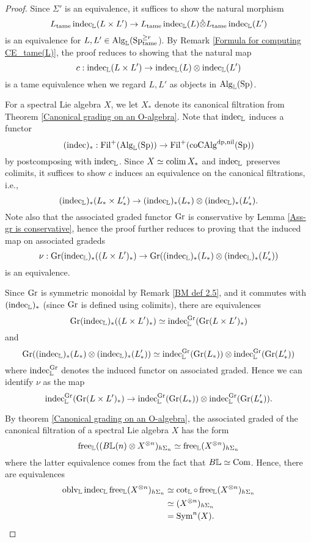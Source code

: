 \begin{proof}
    Since $\Sigma'$ is an equivalence, it suffices to show
	the natural morphism 
	\[
	L_{\tame}\indec_{\BL}(L \times L') 
	\to 
	L_{\tame}\indec_{\BL}(L)\hat{\otimes} 
	L_{\tame}\indec_{\BL}(L') 
	\]
	is an equivalence for $L,L' \in \Alg_{\BL}(\Sp^{\geq r}_{\tame}$). 
	By Remark \ref{Formula for computing CE_tame(L)}, the proof reduces to showing that the natural map 
	\[
    c:	\indec_{\BL}(L \times L') 
	\to 
	\indec_{\BL}(L)\otimes \indec_{\BL}(L') 
	\]
	is a tame equivalence when we regard $L,L'$ as objects in $\Alg_{\BL}(\Sp)$.

	For a spectral Lie algebra $X$, we let $X_*$ denote its canonical filtration from Theorem \ref{Canonical grading on an O-algebra}. 
	Note that $\indec_{\BL}$ induces a functor 
	$$
	(\indec)_*: \Fil^{+}(\Alg_{\BL}(\Sp))
	\to 
	\Fil^{+}(\coCAlg^{\divpow,\nil}(\Sp))
	$$
	by postcomposing with $\indec_{\BL}$.
	Since $X\simeq \colim X_*$ and $\indec_{\BL}$ preserves colimits, it suffices to show $c$ induces an equivalence on the canonical filtrations, i.e.,
	$$
	(\indec_{\BL})_*(L_* \times L'_*)
	\to 
	(\indec_{\BL})_*(L_*) \otimes (\indec_{\BL})_*(L'_*).
	$$
	Note also that the associated graded functor $\Graded$ is conservative by Lemma \ref{Ass-gr is conservative}, hence the proof further reduces to proving that the induced map on associated gradeds
    \[
    \nu:
	\Graded (\indec_{\BL})_*( (L \times L')_{*} )
	\to 
	\Graded ((\indec_{\BL})_*(L_*)\otimes (\indec_{\BL})_*(L'_*))
	\]
	is an equivalence.
	
	Since $\Graded$ is symmetric monoidal by Remark \ref{BM def 2.5}, and it commutes with $(\indec_{\BL})_*$ (since $\Graded$ is defined using colimits), there are equivalences
	$$
	\Graded (\indec_{\BL})_*( (L \times L')_{*} )
	\simeq \indec_{\BL}^{\Graded} (\Graded (L\times L')_{*})
	$$
	and 
	$$
	\Graded ((\indec_{\BL})_*(L_*)\otimes (\indec_{\BL})_*(L'_*)) 
	\simeq 
	\indec^{\Graded}_{\BL}(\Graded(L_*)) \otimes 
	\indec^{\Graded}_{\BL}(\Graded(L'_*))
	$$
	where $\indec^{\Graded}_{\BL}$ denotes the induced functor on associated graded. Hence we can identify $\nu$ as the map
	$$
	\indec_{\BL}^{\Graded} (\Graded (L\times L')_{*}) 
	\to 
	\indec^{\Graded}_{\BL}(\Graded(L_*)) \otimes 
	\indec^{\Graded}_{\BL}(\Graded(L'_*)).
	$$
	
	By theorem \ref{Canonical grading on an O-algebra}, the associated graded of the canonical filtration of a spectral Lie algebra $X$ has the form 
	$$
	\Free_{\BL}((B\BL(n)\otimes X^{\otimes n})_{h\Sigma_n} \simeq \Free_{\BL}(X^{\otimes n})_{h\Sigma_n}
	$$
	where the latter equivalence comes from the fact that $B\BL\simeq \Com$. 
	Hence, there are equivalences
	\begin{align*}
	\oblv_{\BL}\indec_{\BL}
	\Free_{\BL}(X^{\otimes n})_{h\Sigma_n}
	&\simeq 
	\cot_{\BL}\circ \Free_{\BL}(X^{\otimes n})_{h\Sigma_n}  \\	    
	&\simeq (X^{\otimes n})_{h\Sigma_n} \\
	& = \Sym^n(X).
	\end{align*}


\end{proof}
